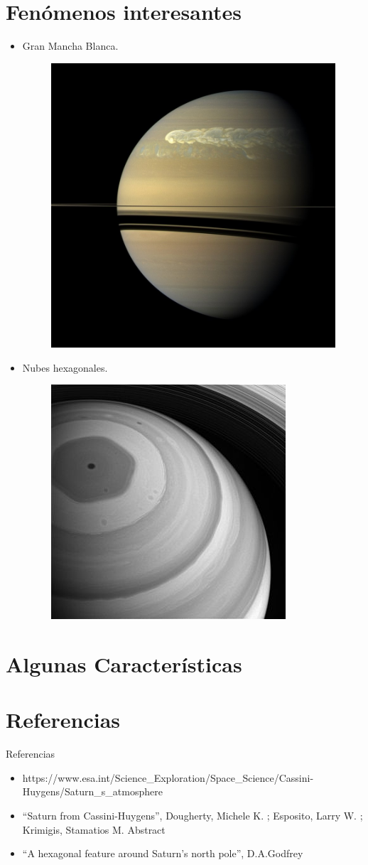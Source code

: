 \documentclass{beamer}
\begin{document}
\section{Fenómenos interesantes}
\begin{frame}
    \begin{itemize}
        \item Gran Mancha Blanca.
            \begin{figure}
                \includegraphics[width=0.35\linewidth]{gws}
            \end{figure}
        \item Nubes hexagonales.
            \begin{figure}
                \includegraphics[width=0.35\linewidth]{hexagon}
            \end{figure}

    \end{itemize}
\end{frame}

\section{Algunas Características}


\section{Referencias}

\begin{frame}{Referencias}
\begin{itemize}
    \item https://www.esa.int/Science\_Exploration/Space\_Science/Cassini-Huygens/Saturn\_s\_atmosphere
    \item ``Saturn from Cassini-Huygens'', Dougherty, Michele K. ; Esposito, Larry W. ; Krimigis, Stamatios M.
        Abstract

    \item ``A hexagonal feature around Saturn's north pole'', D.A.Godfrey

\end{itemize}
\end{frame}
\end{document}

